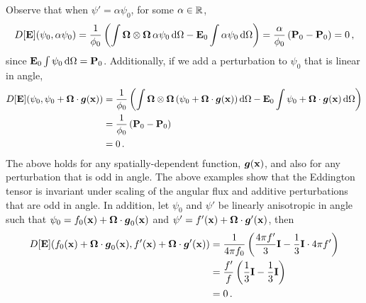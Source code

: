 \documentclass[../doc.tex]{subfiles}
\begin{document}
Observe that when $\psi' = \alpha \psi_0$, for some $\alpha \in \R$, 
	\begin{equation}
		D[\E](\psi_0,\alpha\psi_0) = \frac{1}{\phi_0}\paren{\int \Omegahat\otimes\Omegahat\,\alpha\psi_0 \ud\Omega - \E_0 \int \alpha \psi_0 \ud \Omega} = \frac{\alpha}{\phi_0}\paren{\P_0 - \P_0} = 0 \,,
	\end{equation}
since $\E_0 \int \psi_0 \ud \Omega = \P_0$. 
Additionally, if we add a perturbation to $\psi_0$ that is linear in angle, 
	\begin{equation}
	\begin{aligned}
		D[\E](\psi_0, \psi_0 + \Omegahat\cdot\vec{g}(\x)) &= \frac{1}{\phi_0}\paren{\int \Omegahat\otimes\Omegahat\paren{\psi_0 + \Omegahat\cdot\vec{g}(\x)}\ud \Omega - \E_0 \int \psi_0 + \Omegahat\cdot\vec{g}(\x) \ud \Omega}\\
		&= \frac{1}{\phi_0} \paren{\P_0 - \P_0} \\
		&= 0 \,. 
	\end{aligned}
	\end{equation}
The above holds for any spatially-dependent function, $\vec{g}(\x)$, and also for any perturbation that is odd in angle. 
The above examples show that the Eddington tensor is invariant under scaling of the angular flux and additive perturbations that are odd in angle. In addition, let $\psi_0$ and $\psi'$ be linearly anisotropic in angle such that $\psi_0 = f_0(\x) + \Omegahat\cdot\vec{g}_0(\x)$ and $\psi' = f'(\x) + \Omegahat\cdot\vec{g}'(\x)$, then 
	\begin{equation}
	\begin{aligned}
		D[\E](f_0(\x) + \Omegahat\cdot\vec{g}_0(\x), f'(\x) + \Omegahat\cdot\vec{g}'(\x)) &= \frac{1}{4\pi f_0}\paren{\frac{4\pi f'}{3}\I - \frac{1}{3}\I \cdot 4\pi f'} \\
		&= \frac{f'}{f}\paren{\frac{1}{3}\I - \frac{1}{3}\I} \\
		&= 0 \,. 
	\end{aligned}
	\end{equation}
\end{document}

